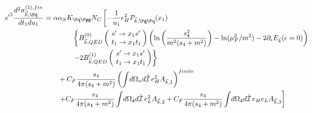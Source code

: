 \begin{align}
{s'}^2\frac{d^2\sigma_{\vec k,\Pq}^{(1),fin}}{dt_1du_1} &=\alpha\alpha_SK_{\Pq\Pgg}N_C\left[-\frac 1 {u_1}e_H^2P_{\vec k,\Pg\Pq}(x_1)\right. \nonumber\\
 &\hspace{40pt}\left\{B^{(0)}_{\vec k,QED}\left(\!\begin{array}{l}s'\rightarrow x_1s'\\t_1\rightarrow x_1 t_1\end{array}\!\!\right) \left(\ln\left(\frac{s_4^2}{m^2(s_4+m^2)}\right)-\ln(\mu_F^2/m^2)-2\partial_\epsilon E_{\vec k}(\epsilon=0)\right)\right. \nonumber\\
 &\hspace{40pt}\left.-2 B^{(1)}_{\vec k,QED}\left(\!\begin{array}{l}s'\rightarrow x_1s'\\t_1\rightarrow x_1 t_1\end{array}\!\!\right)\right\} \nonumber\\
 &\hspace{20pt}+C_F\frac{s_4}{4\pi(s_4+m^2)}\left(\int\!d\Omega_nd\hat{\mathcal I}\,e_H^2A_{\vec k,1}\right)^{finite} \nonumber\\
 &\hspace{20pt}\left.+C_F\frac{s_4}{4\pi(s_4+m^2)}\int\!d\Omega_4d\hat{\mathcal I}\,e_L^2A_{\vec k,2} +C_F\frac{s_4}{4\pi(s_4+m^2)}\int\!d\Omega_4d\hat{\mathcal I}\,e_H e_L A_{\vec k,3} \right]
\end{align}
